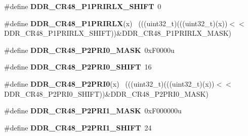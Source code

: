 \begin{DoxyCompactItemize}
\item 
\hypertarget{group___d_d_r___register___masks_gabda5e665d5837a9eec733275a50c5604}{}\#define {\bfseries D\+D\+R\+\_\+\+C\+R48\+\_\+\+P1\+P\+R\+I\+R\+L\+X\+\_\+\+S\+H\+I\+F\+T}~0\label{group___d_d_r___register___masks_gabda5e665d5837a9eec733275a50c5604}

\item 
\hypertarget{group___d_d_r___register___masks_ga37494dd484c9e4f2782d8925453c8418}{}\#define {\bfseries D\+D\+R\+\_\+\+C\+R48\+\_\+\+P1\+P\+R\+I\+R\+L\+X}(x)                                      ~(((uint32\+\_\+t)(((uint32\+\_\+t)(x))$<$$<$D\+D\+R\+\_\+\+C\+R48\+\_\+\+P1\+P\+R\+I\+R\+L\+X\+\_\+\+S\+H\+I\+F\+T))\&D\+D\+R\+\_\+\+C\+R48\+\_\+\+P1\+P\+R\+I\+R\+L\+X\+\_\+\+M\+A\+S\+K)\label{group___d_d_r___register___masks_ga37494dd484c9e4f2782d8925453c8418}

\item 
\hypertarget{group___d_d_r___register___masks_ga182c34ef99b4832e1771dd9c28103144}{}\#define {\bfseries D\+D\+R\+\_\+\+C\+R48\+\_\+\+P2\+P\+R\+I0\+\_\+\+M\+A\+S\+K}~0x\+F0000u\label{group___d_d_r___register___masks_ga182c34ef99b4832e1771dd9c28103144}

\item 
\hypertarget{group___d_d_r___register___masks_ga7aa8af8cba82173b2580c3cbbec11771}{}\#define {\bfseries D\+D\+R\+\_\+\+C\+R48\+\_\+\+P2\+P\+R\+I0\+\_\+\+S\+H\+I\+F\+T}~16\label{group___d_d_r___register___masks_ga7aa8af8cba82173b2580c3cbbec11771}

\item 
\hypertarget{group___d_d_r___register___masks_ga718f1b0f6daa9b1a84f62821b15582f0}{}\#define {\bfseries D\+D\+R\+\_\+\+C\+R48\+\_\+\+P2\+P\+R\+I0}(x)                                          ~(((uint32\+\_\+t)(((uint32\+\_\+t)(x))$<$$<$D\+D\+R\+\_\+\+C\+R48\+\_\+\+P2\+P\+R\+I0\+\_\+\+S\+H\+I\+F\+T))\&D\+D\+R\+\_\+\+C\+R48\+\_\+\+P2\+P\+R\+I0\+\_\+\+M\+A\+S\+K)\label{group___d_d_r___register___masks_ga718f1b0f6daa9b1a84f62821b15582f0}

\item 
\hypertarget{group___d_d_r___register___masks_ga2044ad28eb0b6e22fabad3f58fd70d6d}{}\#define {\bfseries D\+D\+R\+\_\+\+C\+R48\+\_\+\+P2\+P\+R\+I1\+\_\+\+M\+A\+S\+K}~0x\+F000000u\label{group___d_d_r___register___masks_ga2044ad28eb0b6e22fabad3f58fd70d6d}

\item 
\hypertarget{group___d_d_r___register___masks_ga15fdee9484e3e0148262219e5a0f816c}{}\#define {\bfseries D\+D\+R\+\_\+\+C\+R48\+\_\+\+P2\+P\+R\+I1\+\_\+\+S\+H\+I\+F\+T}~24\label{group___d_d_r___register___masks_ga15fdee9484e3e0148262219e5a0f816c}


\end{DoxyCompactItemize}
